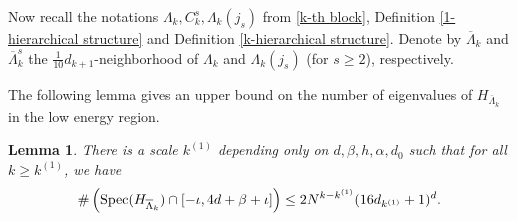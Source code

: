\documentclass[11pt,reqno,UTF8,twoside]{amsart}
\newcommand{\spec}{{\rm Spec}}
\newcommand{\barLambda}{\overline{\Lambda}}
\newtheorem{lem}[thm]{Lemma}
\theoremstyle{definition}
\numberwithin{equation}{section}
\begin{document}
Now recall the notations $\Lambda_k, C_k^s, \Lambda_k(j_s)$ from \eqref{k-th block}, Definition \ref{1-hierarchical structure} and Definition \ref{k-hierarchical structure}. Denote by $\overline{\Lambda}_k$ and $\overline{\Lambda}_{k}^s$ the $\frac{1}{10}d_{k+1}$-neighborhood of $\Lambda_k$ and $\Lambda_k(j_s)$ (for $s\geq 2$), respectively.

The following lemma gives an upper bound  on  the number of eigenvalues of $H_{\overline{\Lambda}_k}$ in the low energy region.
\begin{lem}\label{eigenvalue number}
  There is a scale $k^{(1)}$ depending only on $d,\beta,h,\alpha,d_0$ such that for all $k\geq k^{(1)}$, we have 
  \[\#\left( \spec(H_{\barLambda_k})\cap [-\iota,4d+\beta+\iota] \right)\leq 2 N^{k-k^{(1)}} (16d_{k^{(1)}}+1)^{d}. \] 
\end{lem}
\end{document}
